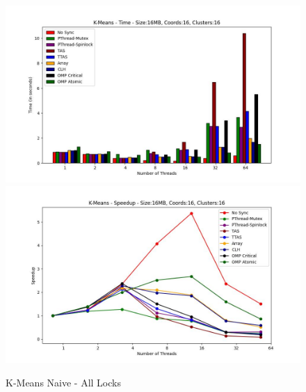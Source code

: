 \documentclass[../final_report.tex]{subfiles}
\begin{document}
\begin{figure}[H]
    \centering
        \includegraphics[scale=0.7]{outFilesAffinityMouliko/plots/kmeans_locks_all.jpg}
        \includegraphics[scale=0.7]{outFilesAffinityMouliko/plots/kmeans_locks_all_speedup.jpg}
    \caption{K-Means Naive - All Locks}
    \label{fig:K-Means Naive - All Locks}
\end{figure}
\end{document}
